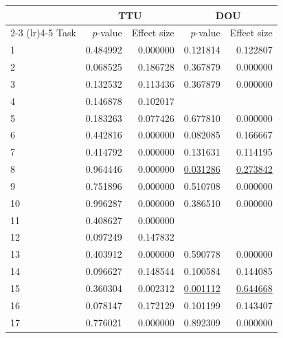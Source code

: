 \begin{tabular}{lrrrr}
\toprule
& \multicolumn{2}{c}{TTU} & \multicolumn{2}{c}{DOU} \\
\cmidrule(lr){2-3} \cmidrule(lr){4-5}
Task & $p$-value & Effect size & $p$-value & Effect size \\
\midrule
1 & \num{0.484992} & \num{0.000000} & \num{0.121814} & \num{0.122807} \\
2 & \num{0.068525} & \num{0.186728} & \num{0.367879} & \num{0.000000} \\
3 & \num{0.132532} & \num{0.113436} & \num{0.367879} & \num{0.000000} \\
4 & \num{0.146878} & \num{0.102017} &  &  \\
5 & \num{0.183263} & \num{0.077426} & \num{0.677810} & \num{0.000000} \\
6 & \num{0.442816} & \num{0.000000} & \num{0.082085} & \num{0.166667} \\
7 & \num{0.414792} & \num{0.000000} & \num{0.131631} & \num{0.114195} \\
8 & \num{0.964446} & \num{0.000000} & \underline{\num{0.031286}} & \underline{\num{0.273842}} \\
9 & \num{0.751896} & \num{0.000000} & \num{0.510708} & \num{0.000000} \\
10 & \num{0.996287} & \num{0.000000} & \num{0.386510} & \num{0.000000} \\
11 & \num{0.408627} & \num{0.000000} &  &  \\
12 & \num{0.097249} & \num{0.147832} &  &  \\
13 & \num{0.403912} & \num{0.000000} & \num{0.590778} & \num{0.000000} \\
14 & \num{0.096627} & \num{0.148544} & \num{0.100584} & \num{0.144085} \\
15 & \num{0.360304} & \num{0.002312} & \underline{\num{0.001112}} & \underline{\num{0.644668}} \\
16 & \num{0.078147} & \num{0.172129} & \num{0.101199} & \num{0.143407} \\
17 & \num{0.776021} & \num{0.000000} & \num{0.892309} & \num{0.000000} \\
\bottomrule
\end{tabular}
